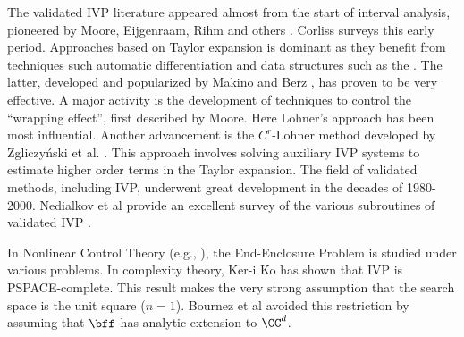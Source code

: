 
The validated IVP literature appeared almost from the start of
	interval analysis, pioneered
	by Moore, Eijgenraam, Rihm and others
	\cite{moore:autoAnalysis:65,moore-v1-autoAnalysis,moore:bk,
	eijgenraam:ivp:81,rihm:interval-ivp:94}.
	Corliss \cite{corliss:survey-ode-intvl:89} surveys this early period.
	Approaches based on Taylor expansion is dominant as they benefit
	from techniques such automatic differentiation
	and data structures such as the .  The latter,
	developed and popularized by Makino and Berz
	\cite{makino-berz:taylorModels:17, bunger:taylorODE:20,
		bunger:taylor-precond:21},
	has proven to be very effective. 
	A major activity is the development of techniques
	to control the ``wrapping effect'', first described by Moore.
	Here Lohner's approach \cite{lohner:thesis,adams:enclosure:87}
	has been most influential. 
	Another advancement is the $C^r$-Lohner method
	developed by Zgliczyński et al. \cite{zgliczynski:lohner:02}. This
	approach involves %
	solving auxiliary IVP systems to estimate
	higher order terms in the Taylor expansion.
	The field of validated methods, including IVP,
	underwent great development in the decades of 1980-2000.
	Nedialkov et al provide an excellent survey of
	the various subroutines of validated IVP
	\cite{jackson+nedialkov:advances-ode:02, nedialkov:thesis:99,
	nedialkov-jackson-pryce:HOI:01, nedialkov+2:validated-ode:99}.

In Nonlinear Control Theory
	(e.g., \cite{scott-barton:bounds:13, fan+3:simulation-reach:18}),
	the End-Enclosure Problem is studied under various
	 problems.
In complexity theory, Ker-i Ko \cite{ko:real:bk} has shown
	that IVP is PSPACE-complete.
	This result makes the very strong assumption
	that the search space is the unit square ($n=1$).
	Bournez et al \cite{bournez+2:ode-unbounded:11}
	avoided this restriction by assuming that $\bff$
	has analytic extension  to $\CC^d$.
	
